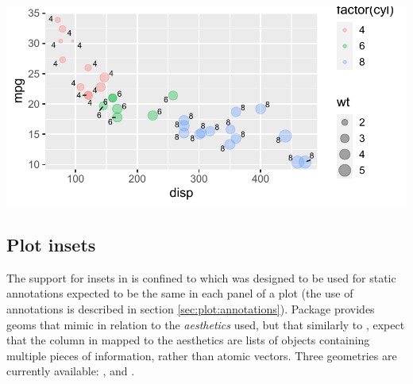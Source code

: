 \documentclass[krantz2]{krantz}\usepackage{knitr}
\begin{document}
\begin{knitrout}\footnotesize
{}\color{fgcolor}\begin{kframe}
\begin{alltt}
\hlstd{(} 
        \hlstd{=} \hlstd{(}   
                      \hlstd{=}      \hlopt{+}
  \hlstd{()} \hlopt{+}
  \hlstd{(} \hlstd{=} \hlopt{/}\hlstd{)} \hlopt{+}
  \hlstd{(} \hlstd{=} \hlstd{,}  \hlstd{=} \hlstd{,}
                   \hlstd{=} \hlstd{,}  \hlstd{=} \hlstd{)}
\end{alltt}
\end{kframe}

{\centering \includegraphics[width=.7\textwidth]{figure/pos-repel-plot-01-1} 

}


\end{knitrout}

\subsection{Plot insets}\label{sec:plot:insets}

The support for insets in  is confined to  which was designed to be used for static annotations expected to be the same in each panel of a plot (the use of annotations is described in section \ref{sec:plot:annotations}). Package  provides geoms that mimic  in relation to the \emph{aesthetics} used, but that similarly to , expect that the column in  mapped to the  aesthetics are lists of objects containing multiple pieces of information, rather than atomic vectors. Three geometries are currently available: ,  and .
\end{document}
